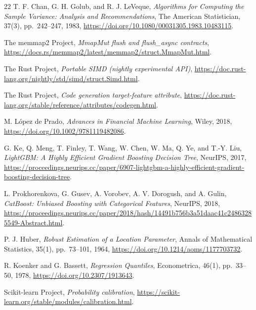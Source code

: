 \documentclass{strategynet-journal}
\begin{document}
\begin{thebibliography}{22}
T. F. Chan, G. H. Golub, and R. J. LeVeque,
\emph{Algorithms for Computing the Sample Variance: Analysis and
Recommendations},
The American Statistician, 37(3), pp.~242--247, 1983,
\url{https://doi.org/10.1080/00031305.1983.10483115}.

The memmap2 Project,
\emph{MmapMut flush and flush\_async contracts},
\url{https://docs.rs/memmap2/latest/memmap2/struct.MmapMut.html}.

The Rust Project,
\emph{Portable SIMD (nightly experimental API)},
\url{https://doc.rust-lang.org/nightly/std/simd/struct.Simd.html}.

The Rust Project,
\emph{Code generation target-feature attribute},
\url{https://doc.rust-lang.org/stable/reference/attributes/codegen.html}.

M. L\'opez de Prado,
\emph{Advances in Financial Machine Learning},
Wiley, 2018,
\url{https://doi.org/10.1002/9781119482086}.

G. Ke, Q. Meng, T. Finley, T. Wang, W. Chen, W. Ma, Q. Ye, and T.-Y. Liu,
\emph{LightGBM: A Highly Efficient Gradient Boosting Decision Tree},
NeurIPS, 2017,
\url{https://proceedings.neurips.cc/paper/6907-lightgbm-a-highly-efficient-gradient-boosting-decision-tree}.

L. Prokhorenkova, G. Gusev, A. Vorobev, A. V. Dorogush, and A. Gulin,
\emph{CatBoost: Unbiased Boosting with Categorical Features},
NeurIPS, 2018,
\url{https://proceedings.neurips.cc/paper/2018/hash/14491b756b3a51daac41c24863285549-Abstract.html}.

P. J. Huber,
\emph{Robust Estimation of a Location Parameter},
Annals of Mathematical Statistics, 35(1), pp.~73--101, 1964,
\url{https://doi.org/10.1214/aoms/1177703732}.

R. Koenker and G. Bassett,
\emph{Regression Quantiles},
Econometrica, 46(1), pp.~33--50, 1978,
\url{https://doi.org/10.2307/1913643}.

Scikit-learn Project,
\emph{Probability calibration},
\url{https://scikit-learn.org/stable/modules/calibration.html}.

\end{thebibliography}
\end{document}

